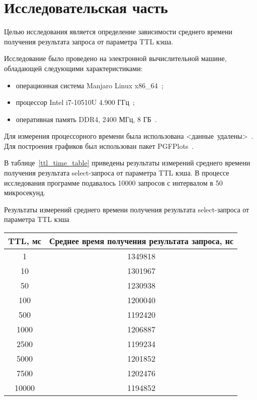 \chapter{Исследовательская часть}

Целью исследования является определение зависимости среднего времени получения результата запроса от параметра TTL кэша.

Исследование было проведено на электронной вычислительной машине, обладающей следующими характеристиками:
\begin{itemize}
	\item операционная система Manjaro Linux x86\_64~\cite{manjaro};
	\item процессор Intel i7-10510U 4.900 ГГц~\cite{cpu};
	\item оперативная память DDR4, 2400 МГц, 8 ГБ~\cite{ram}.
\end{itemize}

Для измерения процессорного времени была использована <данные~удалены>~\cite{}. Для построения графиков был использован пакет PGFPlots~\cite{pgfplots}.

В таблице~\ref{ttl_time_table} приведены результаты измерений среднего времени получения результата select-запроса от параметра TTL кэша. В процессе исследования программе подавалось 10000 запросов с интервалом в 50 микросекунд.
\begin{center}
	\begin{threeparttable}
		\captionsetup{justification=raggedright,singlelinecheck=off}
		\caption{\label{ttl_time_table}Результаты измерений среднего времени получения результата select-запроса от параметра TTL кэша}
		\centering
		\begin{tabular}{|c|c|}
			\hline
			TTL, мс & Среднее время получения результата запроса, нс \\
			\hline
			1 & 1349818 \\
			\hline
			10 & 1301967 \\
			\hline
			50 & 1230938 \\
			\hline
			100 & 1200040 \\
			\hline
			500 & 1192420 \\
			\hline
			1000 & 1206887 \\
			\hline
			2500 & 1199234 \\
			\hline
			5000 & 1201852 \\
			\hline
			7500 & 1202476 \\
			\hline
			10000 & 1194852 \\
			\hline
		\end{tabular}
	\end{threeparttable}
\end{center}

